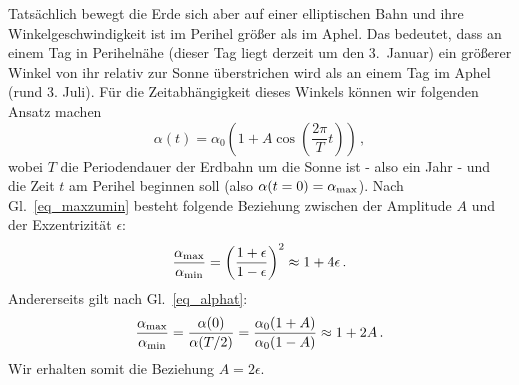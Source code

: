 Tats\"achlich bewegt die Erde sich aber auf einer elliptischen Bahn und ihre Winkelgeschwindigkeit
ist im Perihel gr\"o\ss er als im Aphel. Das bedeutet, dass an einem Tag in Periheln\"ahe (dieser Tag
liegt derzeit um den 3.\ Januar) ein gr\"o\ss erer Winkel von ihr relativ zur Sonne \"uberstrichen wird
als an einem Tag im Aphel (rund 3. Juli). F\"ur die Zeitabh\"angigkeit dieses Winkels k\"onnen wir
folgenden Ansatz machen
\begin{equation}
\label{eq_alphat}
                \alpha(t) = \alpha_0 \left( 1 + A \cos \left( \frac{2\pi}{T} t \right) \right)  \, , 
\end{equation} 
wobei $T$ die Periodendauer der Erdbahn um die Sonne ist - also ein Jahr -
und die Zeit $t$ am Perihel beginnen soll (also $\alpha(t=0)=\alpha_{\rm max}$). 
Nach Gl.\ \ref{eq_maxzumin} besteht folgende Beziehung zwischen der Amplitude $A$ und
der Exzentrizit\"at $\epsilon$: 
\begin{equation}
               \frac{\alpha_{\rm max}}{\alpha_{\rm min}} = \left( \frac{  1 + \epsilon}{1-\epsilon} \right)^2
              \approx 1+4\epsilon  \, . 
\end{equation} 
Andererseits gilt nach Gl.\ \ref{eq_alphat}:
\begin{equation}
               \frac{\alpha_{\rm max}}{\alpha_{\rm min}} =
            \frac{\alpha(0)}{\alpha(T/2)} = \frac{ \alpha_0 ( 1 + A )}{\alpha_0(1-A)} 
            \approx 1 + 2A  \, . 
\end{equation} 
Wir erhalten somit die Beziehung $A = 2 \epsilon$. 

